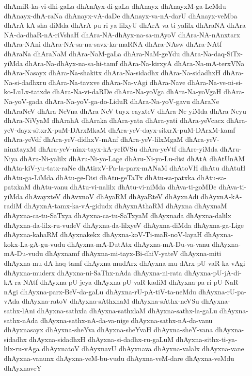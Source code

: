 {dhAmiR-ka-vi-dhi-gaLa
dhAnAyx-di-gaLa
dhAnayx
dhAnayxM-ga-LeMdu
dhAnayx-dhA-raNa
dhAnayx-vA-daDe
dhAnayx-va-nA-darU
dhAnayx-veMba
dhArA-kA-sha-diMda
dhArA-pu-ri-ya-lilxyU
dhArA-va-ti-yalilx
dhAraNA
dhAra-NA-da-dhaR-nA-riVshaH
dhAra-NA-dhAyx-na-sa-mAyoV
dhAra-NA-nAnxtarx
dhAra-NAni
dhAra-NA-sa-na-savx-ka-maRNA
dhAra-NAsw
dhAra-NAtf
dhAraNa
dhAraNaM
dhAra-NaM-gaLa
dhAra-NaM-geYdu
dhAra-Na-daq-SiTx-yiMda
dhAra-Na-dhAyx-na-sa-hi-tamf
dhAra-Na-kirxyA
dhAra-Na-mA-terxVNa
dhAra-Nasayx
dhAra-Na-shakitx
dhAra-Na-sidadhx
dhAra-Na-sidadhxH
dhAra-Na-si-dadhxru
dhAra-Na-tavxve
dhAra-Na-vAgi
dhAra-Nave
dhAra-Na-ve-ni-si-ko-LuLx-tatxde
dhAra-Na-vi-daRDe
dhAra-Na-yoVga
dhAra-Na-yoVgaH
dhAra-Na-yoV-gada
dhAra-Na-yoV-ga-do-LiduR
dhAra-Na-yoV-gavu
dhAraNe
dhAraNeV
dhAra-NeVna
dhAra-NeV-tuyx-cayxteV
dhAra-Ne-yiMda
dhAra-Neyu
dhAra-NiVyaM
dhArahA
dhAraka
dhAra-yata
dhAra-yati
dhAra-yeVcacx
dhAra-yeV-dayx-sitxrX-puM-DArxMkaM
dhAra-yeV-dayx-sitxrX-puM-DArxM-kamf
dhAra-yeVdf
dhAra-yeV-didhxV-mAnf
dhAra-yeV-lilxMgaM
dhAra-yeV-ninxtayxM
dhAra-yeV-ninx-tayx-kA-yeRVSu
dhAra-yeVtf
dhAre-yiMda
dhAru-Niya
dhAru-Ni-yalilx
dhAru-Ni-yo-Lage
dhAru-Ni-yo-Lu-disi
dhAtA
dhAtUnAM
dhAta-kiV-yu-tatx-raNe
dhAtirxV-Pa-la-parx-mANaM
dhAtoVH
dhAtu
dhAtuH
dhAtu-ga-LiMda
dhAtu-ge-Disi
dhAtu-geTaTx
dhAtu-sa-patxka
dhAtu-sa-patxkaM
dhAtu-vanu
dhAtu-vi-nalilx
dhAtu-vi-niMda
dhAva-ti-goMDe
dhAva-ti-yiMda
dhAvayxteV
dhAvxnoV
dhAyaRM
dhAyaRteV
dhAyxnAdi
dhAyxnA-kA-radiM
dhAyxnA-tamx-ka-vA-gidudx
dhAyxnAthaRM
dhAyxna
dhAyxnaM
dhAyxna-ca-tu-SaTxya
dhAyxna-ca-tu-SaTxyaM
dhAyxnada
dhAyxna-dalilx
dhAyxna-da-lilx-ru-vudeV
dhAyxna-da-lilxyeV
dhAyxna-diMda
dhAyxna-ga-Lige
dhAyxna-kahaRM
dhAyxnakekx
dhAyxna-koV-Ti-maR-noV-layaH
dhAyxna-kokx-La-gA-gu-vudu
dhAyxna-mA-DutAtx
dhAyxna-mA-Du-va-vanu
dhAyxna-mA-Du-vudu
dhAyxnamf
dhAyxna-mi-tayx-Bi-dhiV-yateV
dhAyxna-miti
dhAyxna-mu-dA-haq-tamf
dhAyxna-mudArx
dhAyxna-mu-dArx-pU-vaR-ka-vAgi
dhAyxna-muderx
dhAyxna-ni-SaThx-nAda
dhAyxna-ni-rata
dhAyxna-pU-jA-di-kA-ra-NAtf
dhAyxna-pU-jeya
dhAyxna-pU-vaR-kadiM
dhAyxna-pa-ri-pU-NaR-nAgi
dhAyxna-parx-BeV-da-gaLu
dhAyxna-rU-pA-tiV-ta-neMdu
dhAyxna-rU-pa-vAda
dhAyxna-ratoV
dhAyxna-sAthxnaM
dhAyxna-sAthx-neVSu
dhAyxna-sathx-lAni
dhAyxna-sathxla
dhAyxna-sathxlaM
dhAyxna-sathx-la-gaLu
dhAyxna-sathx-nAda
dhAyxna-sathx-nA-da-va-nige
dhAyxna-sathx-nA-da-vanu
dhAyxnasayx
dhAyxna-sheYva
dhAyxna-sheYvaH
dhAyxna-sheY-vana
dhAyxna-sidadhx
dhAyxna-sidadhxH
dhAyxna-si-dadhx-ru-gaLuM
dhAyxna-sithx-ti-ya-lilx-ru-vAga
dhAyxnatoV
dhAyxnavU
dhAyxnava
dhAyxna-valalx
dhAyxna-vane
dhAyxna-vanunx
dhAyxna-veM-bu-vudu
dhAyxna-veM-dare
dhAyxna-veMdu
dhAyxnaveY
}
